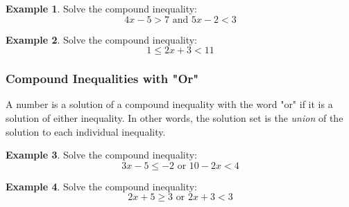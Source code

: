 \documentclass[addpoints,12pt]{exam}
\theoremstyle{definition}
\newtheorem{example}{Example}[subsection]
\begin{document}
\begin{example}
Solve the compound inequality:
\[ 4x - 5 > 7 \text{ and } 5x-2 < 3\]
\vspace{3.5in}
\end{example}

\begin{example}
Solve the compound inequality:
\[ 1 \le 2x + 3 < 11\]
\end{example}

\newpage

\subsubsection*{Compound Inequalities with "Or"}

A number is a solution of a compound inequality with the word "or" if it is a solution of either inequality. In other words, the solution set is the \emph{union} of the solution to each individual inequality.
\vspace{.2in}

\begin{example}
Solve the compound inequality:
\[3x -5 \le -2 \text{ or } 10 - 2x < 4\]
\vspace{2in}
\end{example}

\begin{example}
Solve the compound inequality:
\[2x + 5 \ge 3 \text{ or } 2x + 3 < 3\]
\end{example}
\end{document}
